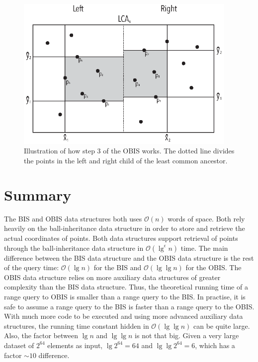 \begin{figure}[h]
    \centering
    \includegraphics[width=0.95\textwidth]{pictures/ors_step3.eps}
    \caption{Illustration of how step $3$ of the OBIS works. The dotted line divides the points in the left and right child of the least common ancestor.}
    \label{fig:orsearchfigure}
\end{figure}
\clearpage


\section{Summary}
\label{sect:summaryprim}

The BIS and OBIS data structures both uses $\mathcal{O}(n)$ words of space. Both rely heavily on the ball-inheritance data structure in order to store and retrieve the actual coordinates of points. Both data structures support retrieval of points through the ball-inheritance data structure in $\mathcal{O}(\lg^\epsilon n)$ time. The main difference between the BIS data structure and the OBIS data structure is the rest of the query time: $\mathcal{O}(\lg n)$ for the BIS and $\mathcal{O}(\lg \lg n)$ for the OBIS. The OBIS data structure relies on more auxiliary data structures of greater complexity than the BIS data structure. Thus, the theoretical running time of a range query to OBIS is smaller than a range query to the BIS. In practise, it is safe to assume a range query to the BIS is faster than a range query to the OBIS. With much more code to be executed and using more advanced auxiliary data structures, the running time constant hidden in $\mathcal{O}(\lg \lg n)$ can be quite large. Also,  the factor between $\lg n$ and $\lg \lg n$ is not that big. Given a very large dataset of $2^{64}$ elements as input, $\lg 2^{64} = 64$ and $\lg \lg 2^{64} = 6$, which has a factor $\sim10$ difference. \\


